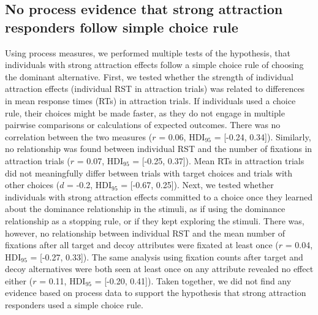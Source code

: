 \documentclass[11pt, a4paper]{article}
\begin{document}
\subsection*{No process evidence that strong attraction responders follow simple choice rule}
\label{sup:ade-choicerule}

Using process measures, we performed multiple tests of the hypothesis, that individuals with strong attraction effects follow a simple choice rule of choosing the dominant alternative. First, we tested whether the strength of individual attraction effects (individual RST in attraction trials) was related to differences in mean response times (RTs) in attraction trials. If individuals used a choice rule, their choices might be made faster, as they do not engage in multiple pairwise comparisons or calculations of expected outcomes. There was no correlation between the two measures ($r$ = 0.06, HDI$_{95}$ = [-0.24, 0.34]). Similarly, no relationship was found between individual RST and the number of fixations in attraction trials ($r$ = 0.07, HDI$_{95}$ = [-0.25, 0.37]). Mean RTs in attraction trials did not meaningfully differ between trials with target choices and trials with other choices ($d$ = -0.2, HDI$_{95}$ = [-0.67, 0.25]). Next, we tested whether individuals with strong attraction effects committed to a choice once they learned about the dominance relationship in the stimuli, as if using the dominance relationship as a stopping rule, or if they kept exploring the stimuli. There was, however, no relationship between individual RST and the mean number of fixations after all target and decoy attributes were fixated at least once ($r$ = 0.04, HDI$_{95}$ = [-0.27, 0.33]). The same analysis using fixation counts after target and decoy alternatives were both seen at least once on any attribute revealed no effect either ($r$ = 0.11, HDI$_{95}$ = [-0.20, 0.41]).
Taken together, we did not find any evidence based on process data to support the hypothesis that strong attraction responders used a simple choice rule.
\end{document}
